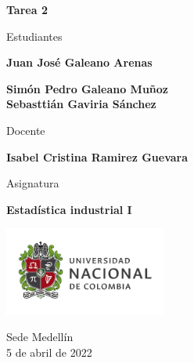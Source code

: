 \begin{titlepage}
   \Large{
   \begin{center}
       \vspace*{1cm}

       \textbf{Tarea 2}

            
       \vspace{1.5cm}
       
       Estudiantes
       
       \vspace{0.5cm}
        
	\textbf{Juan José Galeano Arenas}        

       \textbf{Simón Pedro Galeano Muñoz} \\

	\textbf{Sebasttián Gaviria Sánchez}

              \vspace{1cm}
       
       Docente
       
       \vspace{0.5cm}

       \textbf{Isabel Cristina Ramirez Guevara}
       
       \vspace{0.4cm}

       \vspace{1.4cm}
       
       Asignatura
       
       \vspace{0.5cm}

       \textbf{Estadística industrial I}

       \vfill

            
       \vspace{0.4cm}
     
       \includegraphics[width=0.4\textwidth]{logounal.png}
            
       Sede Medellín\\
       5 de abril de 2022
       
   \end{center}
   }
\end{titlepage}